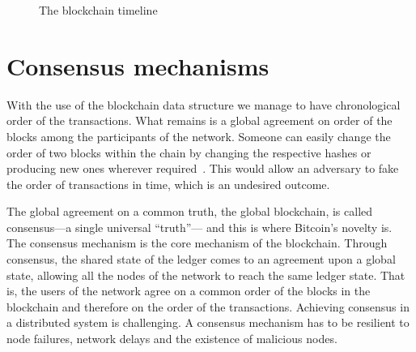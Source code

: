 \begin{figure}[ht!]
  \caption{The blockchain timeline}
  \label{fig:blockchain_timeline}
\end{figure}

\section{Consensus mechanisms}\label{blockchain:consensus_mechanisms}

With the use of the blockchain data structure we manage to have chronological order of the transactions. What remains is a global agreement on order of the blocks among the participants of the network. Someone can easily change the order of two blocks within the chain by changing the respective hashes or producing new ones wherever required~\cite{zindros_thesis}. This would allow an adversary to fake the order of transactions in time, which is an undesired outcome.

The global agreement on a common truth, the global blockchain, is called consensus---a single universal “truth”--- and this is where Bitcoin's novelty is. The consensus mechanism is the core mechanism of the blockchain. Through consensus, the shared state of the ledger comes to an agreement upon a global state, allowing all the nodes of the network to reach the same ledger state. That is, the users of the network agree on a common order of the blocks in the blockchain and therefore on the order of the transactions. Achieving consensus in a distributed system is challenging. A consensus mechanism has to be resilient to node failures, network delays and the existence of malicious nodes.

